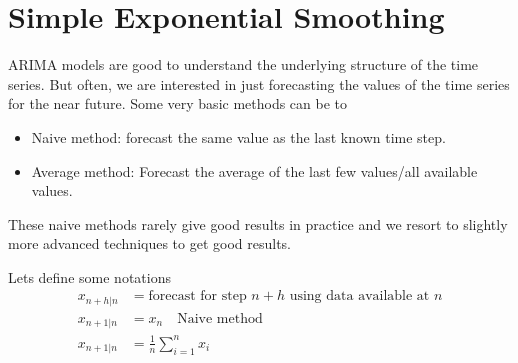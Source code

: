 \documentclass[../../time_series_notes.tex]{subfiles}
\begin{document}
\chapter{Simple Exponential Smoothing}
ARIMA models are good to understand the underlying structure of the time series. But often, we are interested in just forecasting the values of the time series for the near future. Some very basic methods can be to
\begin{itemize}
    \item Naive method: forecast the same value as the last known time step.
    \item Average method: Forecast the average of the last few values/all available values.
\end{itemize}

These naive methods rarely give good results in practice and we resort to slightly more advanced techniques to get good results.\newline

Lets define some notations
\begin{align*}
    x_{n+h|n} &= \text{forecast for step $n+h$ using data available at $n$}\\
    x_{n+1|n} &= x_{n} \quad \text{Naive method}\\
    x_{n+1|n} &= \frac{1}{n} \sum_{i=1}^{n}x_{i}
\end{align*}
\end{document}
